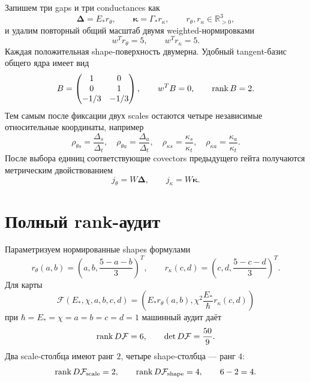 Запишем три gaps и три conductances как
\begin{equation}
 \boldsymbol\Delta=E_*r_\theta,
 \qquad
 \boldsymbol\kappa=\Gamma_*r_\kappa,
 \qquad r_\theta,r_\kappa\in\mathbb R_{>0}^3,
 \label{eq:v9-kms-covector-origin-factorization}
\end{equation}
и удалим повторный общий масштаб двумя weighted-нормировками
\begin{equation}
 w^Tr_\theta=5,
 \qquad w^Tr_\kappa=5.
 \label{eq:v9-kms-covector-origin-normalizations}
\end{equation}
Каждая положительная shape-поверхность двумерна. Удобный tangent-базис
общего ядра имеет вид
\begin{equation}
 B=\begin{pmatrix}
 1&0\\0&1\\-1/3&-1/3
 \end{pmatrix},
 \qquad w^TB=0,
 \qquad \operatorname{rank} B=2.
 \label{eq:v9-kms-covector-origin-shape-basis}
\end{equation}
Тем самым после фиксации двух scales остаются четыре независимые
относительные координаты, например
\begin{equation}
 \rho_{\theta s}=\frac{\Delta_s}{\Delta_t},\quad
 \rho_{\theta a}=\frac{\Delta_a}{\Delta_t},\quad
 \rho_{\kappa s}=\frac{\kappa_s}{\kappa_t},\quad
 \rho_{\kappa a}=\frac{\kappa_a}{\kappa_t}.
 \label{eq:v9-kms-covector-origin-relative-ratios}
\end{equation}
После выбора единиц соответствующие covectors предыдущего гейта получаются
метрическим двойствованием
\begin{equation}
 j_\theta=W\boldsymbol\Delta,
 \qquad
 j_\kappa=W\boldsymbol\kappa.
 \label{eq:v9-kms-covector-origin-metric-duals}
\end{equation}

\section{Полный rank-аудит}

Параметризуем нормированные shapes формулами
\begin{equation}
 r_\theta(a,b)=\left(a,b,\frac{5-a-b}{3}\right)^T,
 \qquad
 r_\kappa(c,d)=\left(c,d,\frac{5-c-d}{3}\right)^T.
 \label{eq:v9-kms-covector-origin-shape-chart}
\end{equation}
Для карты
\begin{equation}
 \mathcal F(E_*,\chi,a,b,c,d)
 =\left(E_*r_\theta(a,b),
 \chi^2\frac{E_*}{\hbar}r_\kappa(c,d)\right)
 \label{eq:v9-kms-covector-origin-full-map}
\end{equation}
при $\hbar=E_*=\chi=a=b=c=d=1$ машинный аудит даёт
\begin{equation}
 \operatorname{rank} D\mathcal F=6,
 \qquad \det D\mathcal F=\frac{50}{9}.
 \label{eq:v9-kms-covector-origin-full-rank}
\end{equation}
Два scale-столбца имеют ранг $2$, четыре shape-столбца --- ранг $4$:
\begin{equation}
 \operatorname{rank} D\mathcal F_{\rm scale}=2,
 \qquad
 \operatorname{rank} D\mathcal F_{\rm shape}=4,
 \qquad
 6-2=4.
 \label{eq:v9-kms-covector-origin-rank-defect}
\end{equation}

